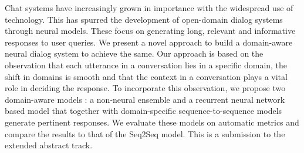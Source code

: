 Chat systems have increasingly grown in importance with the widespread use of technology. This has spurred the development of open-domain dialog systems through neural models. These focus on generating long, relevant and informative responses to user queries. We present a novel approach to build a domain-aware neural dialog system to achieve the same. Our approach is based on the observation that each utterance in a conversation lies in a specific domain, the shift in domains is smooth and that the context in a conversation plays a vital role in deciding the response. To incorporate this observation, we propose two domain-aware models : a non-neural ensemble and a recurrent neural network based model that together with domain-specific sequence-to-sequence models generate pertinent responses. We evaluate these models on automatic metrics and compare the results to that of the Seq2Seq model. This is a submission to the extended abstract track.
